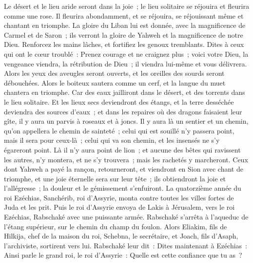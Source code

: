 \begin{multicols}{2}
\VerseOne{}Le désert et le lieu aride seront dans la joie~; le lieu solitaire se réjouira et fleurira comme une rose.
Il fleurira abondamment, et se réjouira, se réjouissant même et chantant en triomphe. La gloire du Liban lui est donnée, avec la magnificence de Carmel et de Saron~; ils verront la gloire de Yahweh et la magnificence de notre Dieu.
Renforcez les mains lâches, et fortifiez les genoux tremblants.
Dites à ceux qui ont le cœur troublé~: Prenez courage et ne craignez plus~; voici votre Dieu, la vengeance viendra, la rétribution de Dieu~; il viendra lui-même et vous délivrera.
Alors les yeux des aveugles seront ouverts, et les oreilles des sourds seront débouchées.
Alors le boiteux sautera comme un cerf, et la langue du muet chantera en triomphe. Car des eaux jailliront dans le désert, et des torrents dans le lieu solitaire.
Et les lieux secs deviendront des étangs, et la terre desséchée deviendra des sources d'eaux~; et dans les repaires où des dragons faisaient leur gîte, il y aura un parvis à roseaux et à joncs.
Il y aura là un sentier et un chemin, qu'on appellera le chemin de sainteté~; celui qui est souillé n'y passera point, mais il sera pour ceux-là~; celui qui va son chemin, et les insensés ne s'y égareront point.
Là il n'y aura point de lion~; et aucune des bêtes qui ravissent les autres, n'y montera, et ne s'y trouvera~; mais les rachetés y marcheront.
Ceux dont Yahweh a payé la rançon, retourneront, et viendront en Sion avec chant de triomphe, et une joie éternelle sera sur leur tête~; ils obtiendront la joie et l'allégresse~; la douleur et le gémissement s'enfuiront.
\VerseOne{}La quatorzième année du roi Ezéchias, Sanchérib, roi d'Assyrie, monta contre toutes les villes fortes de Juda et les prit.
Puis le roi d'Assyrie envoya de Lakis à Jérusalem, vers le roi Ezéchias, Rabschaké avec une puissante armée. Rabschaké s'arrêta à l'aqueduc de l'étang supérieur, sur le chemin du champ du foulon.
Alors Eliakim, fils de Hilkija, chef de la maison du roi, Schebna, le secrétaire, et Joach, fils d'Asaph, l'archiviste, sortirent vers lui.
Rabschaké leur dit~: Dites maintenant à Ezéchias~: Ainsi parle le grand roi, le roi d'Assyrie~: Quelle est cette confiance que tu as~?

\end{multicols}
